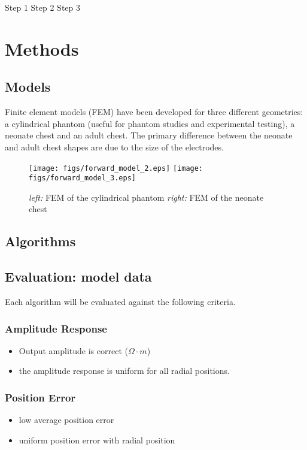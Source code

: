 \documentclass[letterpaper,twocolumn,11pt]{article}
\begin{document}
Step 1 
Step 2
Step 3


\section{Methods}
\subsection{Models}

Finite element models (FEM) have been developed for three
different geometries: a cylindrical phantom (useful for 
phantom studies and experimental testing), a
neonate chest and an adult chest. The primary difference
between the neonate and adult chest shapes are due to
the size of the electrodes.

\begin{figure}[bhtp]
\begin{center}
  \texttt{[image: figs/forward\_model\_2.eps]}
  \texttt{[image: figs/forward\_model\_3.eps]}

\caption{ \label{fig:fm2}
{\em left:} FEM of the cylindrical phantom
{\em right:} FEM of the neonate chest 
}
\end{center}
\end{figure}
\subsection{Algorithms}
\subsection{Evaluation: model data}

Each algorithm will be evaluated against the
following criteria.

\subsubsection{Amplitude Response}
   \begin{itemize}
   \item Output amplitude is correct ($\Omega \cdot m$)
   \item the amplitude response is uniform for all radial positions.
   \end{itemize}

\subsubsection{Position Error}
   \begin{itemize}
   \item low average position error
   \item uniform position error with radial position
   \end{itemize}
\end{document}

